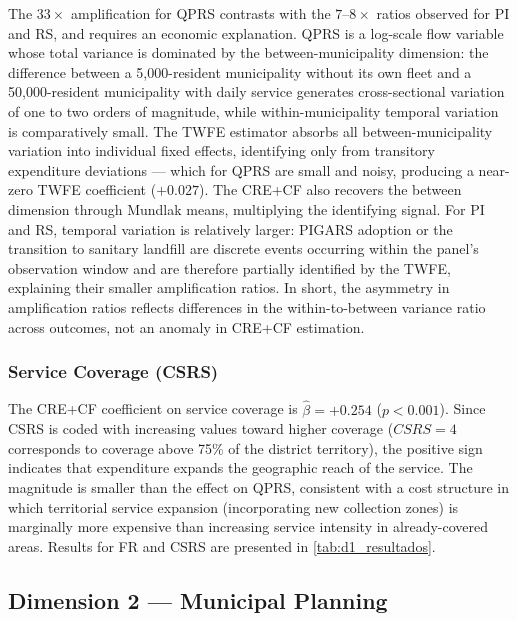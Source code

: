The $33\times$ amplification for QPRS contrasts with the $7$--$8\times$ ratios observed for PI and RS, and requires an economic explanation. QPRS is a log-scale flow variable whose total variance is dominated by the between-municipality dimension: the difference between a 5,000-resident municipality without its own fleet and a 50,000-resident municipality with daily service generates cross-sectional variation of one to two orders of magnitude, while within-municipality temporal variation is comparatively small. The TWFE estimator absorbs all between-municipality variation into individual fixed effects, identifying only from transitory expenditure deviations --- which for QPRS are small and noisy, producing a near-zero TWFE coefficient ($+0.027$). The CRE+CF also recovers the between dimension through Mundlak means, multiplying the identifying signal. For PI and RS, temporal variation is relatively larger: PIGARS adoption or the transition to sanitary landfill are discrete events occurring within the panel's observation window and are therefore partially identified by the TWFE, explaining their smaller amplification ratios. In short, the asymmetry in amplification ratios reflects differences in the within-to-between variance ratio across outcomes, not an anomaly in CRE+CF estimation.

\subsubsection*{Service Coverage (CSRS)}

The CRE+CF coefficient on service coverage is $\hat{\beta} = +0.254$ ($p < 0.001$). Since CSRS is coded with increasing values toward higher coverage ($CSRS = 4$ corresponds to coverage above 75\% of the district territory), the positive sign indicates that expenditure expands the geographic reach of the service. The magnitude is smaller than the effect on QPRS, consistent with a cost structure in which territorial service expansion (incorporating new collection zones) is marginally more expensive than increasing service intensity in already-covered areas. Results for FR and CSRS are presented in \cref{tab:d1_resultados}.

\subsection{Dimension 2 --- Municipal Planning}
\label{sec:d2}

